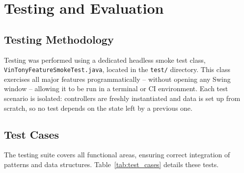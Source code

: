 \documentclass[11pt,a4paper]{article}
\begin{document}
\newpage

\section{Testing and Evaluation}

\subsection{Testing Methodology}
Testing was performed using a dedicated headless smoke test class, \texttt{VinTonyFeatureSmokeTest.java}, located in the \texttt{test/} directory. This class exercises all major features programmatically -- without opening any Swing window -- allowing it to be run in a terminal or CI environment. Each test scenario is isolated: controllers are freshly instantiated and data is set up from scratch, so no test depends on the state left by a previous one.

\subsection{Test Cases}
The testing suite covers all functional areas, ensuring correct integration of patterns and data structures. Table~\ref{tab:test_cases} details these tests.
\end{document}
